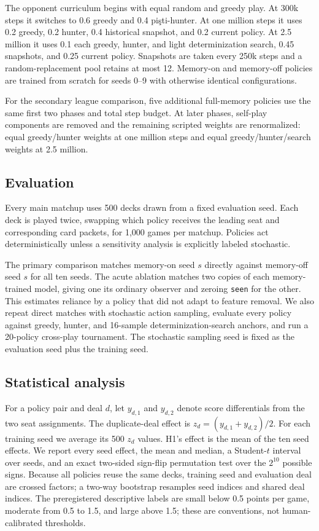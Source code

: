 \documentclass[10pt]{article}
\newcommand{\code}[1]{\texttt{#1}}
\begin{document}
The opponent curriculum begins with equal random and greedy play. At 300k steps it switches to 0.6 greedy and 0.4 pişti-hunter. At one million steps it uses 0.2 greedy, 0.2 hunter, 0.4 historical snapshot, and 0.2 current policy. At 2.5 million it uses 0.1 each greedy, hunter, and light determinization search, 0.45 snapshots, and 0.25 current policy. Snapshots are taken every 250k steps and a random-replacement pool retains at most 12. Memory-on and memory-off policies are trained from scratch for seeds 0--9 with otherwise identical configurations.

For the secondary league comparison, five additional full-memory policies use the same first two phases and total step budget. At later phases, self-play components are removed and the remaining scripted weights are renormalized: equal greedy/hunter weights at one million steps and equal greedy/hunter/search weights at 2.5 million.

\subsection{Evaluation}

Every main matchup uses 500 decks drawn from a fixed evaluation seed. Each deck is played twice, swapping which policy receives the leading seat and corresponding card packets, for 1,000 games per matchup. Policies act deterministically unless a sensitivity analysis is explicitly labeled stochastic.

The primary comparison matches memory-on seed $s$ directly against memory-off seed $s$ for all ten seeds. The acute ablation matches two copies of each memory-trained model, giving one its ordinary observer and zeroing \code{seen} for the other. This estimates reliance by a policy that did not adapt to feature removal. We also repeat direct matches with stochastic action sampling, evaluate every policy against greedy, hunter, and 16-sample determinization-search anchors, and run a 20-policy cross-play tournament. The stochastic sampling seed is fixed as the evaluation seed plus the training seed.

\subsection{Statistical analysis}

For a policy pair and deal $d$, let $y_{d,1}$ and $y_{d,2}$ denote score differentials from the two seat assignments. The duplicate-deal effect is $z_d=(y_{d,1}+y_{d,2})/2$. For each training seed we average its 500 $z_d$ values. H1's effect is the mean of the ten seed effects. We report every seed effect, the mean and median, a Student-$t$ interval over seeds, and an exact two-sided sign-flip permutation test over the $2^{10}$ possible signs. Because all policies reuse the same decks, training seed and evaluation deal are crossed factors; a two-way bootstrap resamples seed indices and shared deal indices. The preregistered descriptive labels are small below 0.5 points per game, moderate from 0.5 to 1.5, and large above 1.5; these are conventions, not human-calibrated thresholds.
\end{document}
